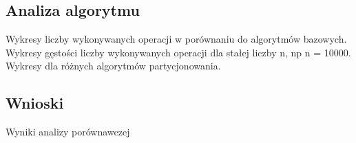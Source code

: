 \subsection{Analiza algorytmu}
Wykresy liczby wykonywanych operacji w porównaniu do algorytmów bazowych.
Wykresy gęstości liczby wykonywanych operacji dla stałej liczby n, np n = 10000.
Wykresy dla różnych algorytmów partycjonowania.

\subsection{Wnioski}
Wyniki analizy porównawczej



